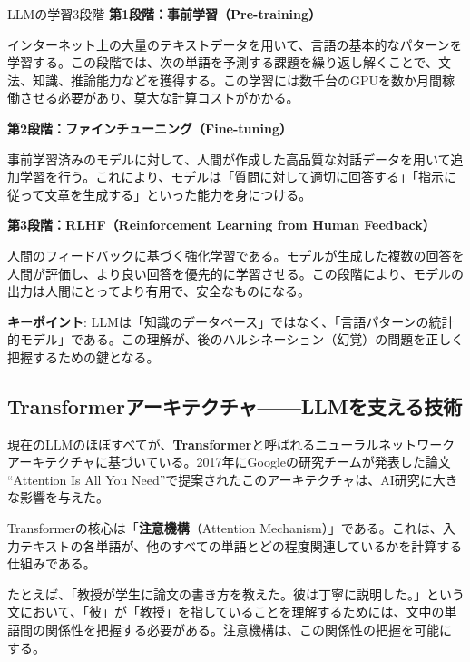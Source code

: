\begin{itembox}[l]{LLMの学習3段階}
\textbf{第1段階：事前学習（Pre-training）}

インターネット上の大量のテキストデータを用いて、言語の基本的なパターンを学習する。この段階では、次の単語を予測する課題を繰り返し解くことで、文法、知識、推論能力などを獲得する。この学習には数千台のGPUを数か月間稼働させる必要があり、莫大な計算コストがかかる。

\vspace{3mm}
\textbf{第2段階：ファインチューニング（Fine-tuning）}

事前学習済みのモデルに対して、人間が作成した高品質な対話データを用いて追加学習を行う。これにより、モデルは「質問に対して適切に回答する」「指示に従って文章を生成する」といった能力を身につける。

\vspace{3mm}
\textbf{第3段階：RLHF（Reinforcement Learning from Human Feedback）}

人間のフィードバックに基づく強化学習である。モデルが生成した複数の回答を人間が評価し、より良い回答を優先的に学習させる。この段階により、モデルの出力は人間にとってより有用で、安全なものになる。
\end{itembox}

\begin{screen}
\textbf{キーポイント}: LLMは「知識のデータベース」ではなく、「言語パターンの統計的モデル」である。この理解が、後のハルシネーション（幻覚）の問題を正しく把握するための鍵となる。
\end{screen}

\subsection{Transformerアーキテクチャ——LLMを支える技術}

現在のLLMのほぼすべてが、\textbf{Transformer}と呼ばれるニューラルネットワークアーキテクチャに基づいている。2017年にGoogleの研究チームが発表した論文 ``Attention Is All You Need''\cite{Vaswani2017}で提案されたこのアーキテクチャは、AI研究に大きな影響を与えた。

Transformerの核心は「\textbf{注意機構}（Attention Mechanism）」である。これは、入力テキストの各単語が、他のすべての単語とどの程度関連しているかを計算する仕組みである。

たとえば、「教授が学生に論文の書き方を教えた。彼は丁寧に説明した。」という文において、「彼」が「教授」を指していることを理解するためには、文中の単語間の関係性を把握する必要がある。注意機構は、この関係性の把握を可能にする。

